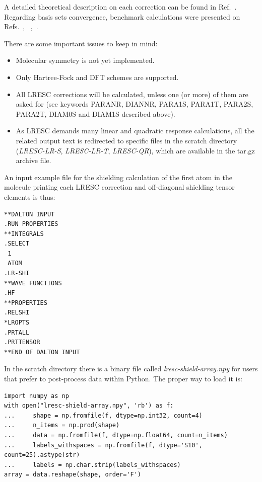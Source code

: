 A detailed theoretical description on each correction can be found in Ref.~\cite{melomaldojcp12}. Regarding basis sets convergence, benchmark calculations were presented on Refs.~\cite{melojcp03}, ~\cite{melomaldojcp12},~\cite{melomaldotca11}.

There are some important issues to keep in mind:
\begin{center}
\begin{itemize}{}{}
\item Molecular symmetry is not yet implemented.
\item Only Hartree-Fock and DFT schemes are supported.
\item All LRESC corrections will be calculated, unless one (or more) of them are asked for (see keywords PARANR, DIANNR, PARA1S, PARA1T, PARA2S, PARA2T, DIAM0S and DIAM1S described above).
\item As LRESC demands many linear and quadratic response calculations, all the related output text is redirected to specific files in the scratch directory (\textit{LRESC-LR-S}, \textit{LRESC-LR-T}, \textit{LRESC-QR}), which are available in the tar.gz archive file.
\end{itemize}
\end{center}

An input example file for the shielding calculation of the first atom in the molecule printing each LRESC correction and off-diagonal shielding tensor elements is thus:

\begin{verbatim}
**DALTON INPUT
.RUN PROPERTIES
**INTEGRALS
.SELECT
 1
 ATOM
.LR-SHI
**WAVE FUNCTIONS
.HF
**PROPERTIES
.RELSHI
*LROPTS
.PRTALL
.PRTTENSOR
**END OF DALTON INPUT
\end{verbatim}


In the scratch directory there is a binary file called \textit{lresc-shield-array.npy} for users that prefer to post-process data within Python. The proper way to load it is:
\begin{lstlisting}
import numpy as np
with open("lresc-shield-array.npy", 'rb') as f:
...     shape = np.fromfile(f, dtype=np.int32, count=4)
...     n_items = np.prod(shape)
...     data = np.fromfile(f, dtype=np.float64, count=n_items)
...     labels_withspaces = np.fromfile(f, dtype='S10', count=25).astype(str)
...     labels = np.char.strip(labels_withspaces)
array = data.reshape(shape, order='F')
\end{lstlisting}

